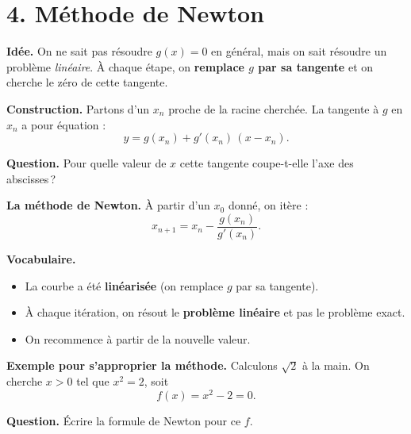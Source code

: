 \section*{4. Méthode de Newton}

\textbf{Idée.}
On ne sait pas résoudre $g(x) = 0$ en général,
mais on sait résoudre un problème \emph{linéaire}. \newline
À chaque étape, on \textbf{remplace $g$ par sa tangente}
et on cherche le zéro de cette tangente.

\medskip

\esquisse[5.5cm]

\textbf{Construction.}
Partons d'un $x_n$ proche de la racine cherchée.
La tangente à $g$ en $x_n$ a pour équation :
\[
  y = g(x_n) + g'(x_n)\,(x - x_n).
\]

\medskip

\textbf{Question.}
Pour quelle valeur de $x$ cette tangente
coupe-t-elle l'axe des abscisses\,?


\medskip

\textbf{La méthode de Newton.}
À partir d'un $x_0$ donné, on itère :
\[
  \boxed{\;x_{n+1} = x_n - \frac{g(x_n)}{g'(x_n)}.\;}
\]

\medskip

\textbf{Vocabulaire.}
\begin{itemize}[leftmargin=*]
  \item La courbe a été \textbf{linéarisée}
        (on remplace $g$ par sa tangente).
  \item À chaque itération, on résout
        le \textbf{problème linéaire} et pas le problème exact.
  \item On recommence à partir de la nouvelle valeur.
\end{itemize}


\medskip

\textbf{Exemple pour s'approprier la méthode.}
Calculons $\sqrt{2}$ à la main.
On cherche $x > 0$ tel que $x^2 = 2$, soit
\[
  f(x) = x^2 - 2 = 0.
\]

\textbf{Question.}
Écrire la formule de Newton pour ce $f$.


